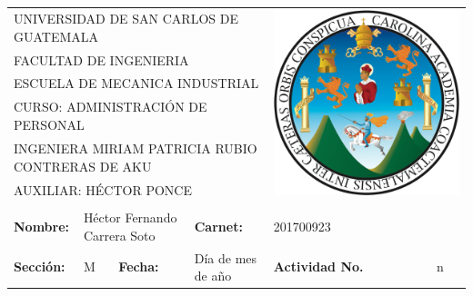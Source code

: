 \documentclass[12pt,letterpaper]{article}
\author{Héctor Fernando Carrera Soto \\ Carné: 201700923}
\begin{document}

\begin{title}

\begin{table}[H]
\begin{tabular}{llllll}
\multicolumn{4}{l}{UNIVERSIDAD DE SAN CARLOS DE GUATEMALA}                                    & \multicolumn{2}{l}{\multirow{6}{*}{\includegraphics[scale=0.18]{escudo_usac.png}}} \\
\multicolumn{4}{l}{FACULTAD DE INGENIERIA}                                                    & \multicolumn{2}{l}{}                      \\
\multicolumn{4}{l}{ESCUELA DE MECANICA INDUSTRIAL}                                            & \multicolumn{2}{l}{}                      \\
\multicolumn{4}{l}{CURSO: ADMINISTRACIÓN DE PERSONAL}                                         & \multicolumn{2}{l}{}                      \\
\multicolumn{4}{l}{INGENIERA MIRIAM PATRICIA RUBIO CONTRERAS DE AKU}                          & \multicolumn{2}{l}{}                      \\
\multicolumn{4}{l}{AUXILIAR: HÉCTOR PONCE}                                                    & \multicolumn{2}{l}{}                      \\
                     &                  &                               &                     &                                &          \\
\textbf{Nombre:}     & \multicolumn{2}{l}{Héctor Fernando Carrera Soto} & \textbf{Carnet:}    & \multicolumn{2}{l}{201700923}             \\
\textbf{Sección:}    & M                & \textbf{Fecha:}               & Día de mes de año   & \textbf{Actividad No.}         & n       
\end{tabular}
\end{table}

\end{title}

\end{document}
